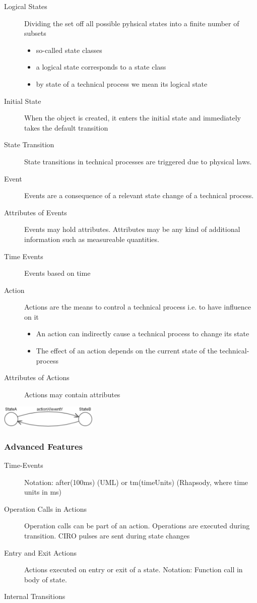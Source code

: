 \begin{description}
    \item[Logical States] Dividing the set off all possible pyhsical states into a finite number of subsets
          \begin{itemize}
              \item so-called state classes
              \item a logical state corresponds to a state class
              \item by state of a technical process we mean its logical state
          \end{itemize}
    \item[Initial State] When the object is created, it enters the initial state and immediately takes the default transition
    \item[State Transition] State transitions in technical processes are triggered due to physical laws.
    \item[Event] Events are a consequence of a relevant state change of a technical process.
    \item[Attributes of Events] Events may hold attributes. Attributes may be any kind of additional information such as measureable quantities.
    \item[Time Events] Events based on time
    \item[Action] Actions are the means to control a technical process i.e. to have influence on it
          \begin{itemize}
              \item An action can indirectly cause a technical process to change its state
              \item The effect of an action depends on the current state of the technical-process
          \end{itemize}
    \item[Attributes of Actions] Actions may contain attributes
\end{description}
\includegraphics[width=0.35\textwidth]{images/UML/statechart.png}

\subsubsection{Advanced Features}
\begin{description}
    \item[Time-Events] Notation: after(100ms) (UML) or tm(timeUnits) (Rhapsody, where time units in ms)
    \item[Operation Calls in Actions] Operation calls can be part of an action.
          Operations are executed during transition.
          CIRO pulses are sent during state changes
    \item[Entry and Exit Actions] Actions executed on entry or exit of a state.
          Notation: Function call in body of state.
    \item[Internal Transitions]
\end{description}